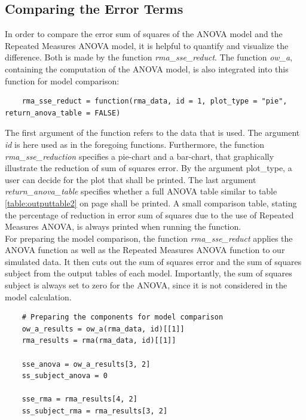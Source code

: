 \documentclass[11pt]{article}
\begin{document}
	
	
	
	\subsection{Comparing the Error Terms}
	In order to compare the error sum of squares of the ANOVA model and the Repeated Measures ANOVA model, it is helpful to quantify and visualize the difference. Both is made by the function \textit{rma\_sse\_reduct}. The function \textit{ow\_a}, containing the computation of the ANOVA model, is also integrated into this function for model comparison:\\
	
	\begin{lstlisting}
	rma_sse_reduct = function(rma_data, id = 1, plot_type = "pie", return_anova_table = FALSE)
	\end{lstlisting}
	
	The first argument of the function refers to the data that is used. The argument \textit{id} is here used as in the foregoing functions. Furthermore, the function \textit{rma_sse_reduction} specifies a pie-chart and a bar-chart, that graphically illustrate the reduction of sum of squares error. By the argument plot_type, a user can decide for the plot that shall be printed. The last argument \textit{return_anova_table} specifies whether a full ANOVA table similar to table \ref{table:outputtable2} on page \pageref{table:outputtable2} shall be printed. A small comparison table, stating the percentage of reduction in error sum of squares due to the use of Repeated Measures ANOVA, is always printed when running the function.\\
	
	For preparing the model comparison, the function \textit{rma\_sse\_reduct} applies the ANOVA function as well as the Repeated Measures ANOVA function to our simulated data. It then cuts out the sum of squares error and the sum of squares subject from the output tables of each model. Importantly, the sum of squares subject is always set to zero for the ANOVA, since it is not considered in the model calculation.
	
	\begin{lstlisting}
	# Preparing the components for model comparison
	ow_a_results = ow_a(rma_data, id)[[1]]
	rma_results = rma(rma_data, id)[[1]]
	
	sse_anova = ow_a_results[3, 2]
	ss_subject_anova = 0
	
	sse_rma = rma_results[4, 2]
	ss_subject_rma = rma_results[3, 2]
	\end{lstlisting}      
	
\end{document}
